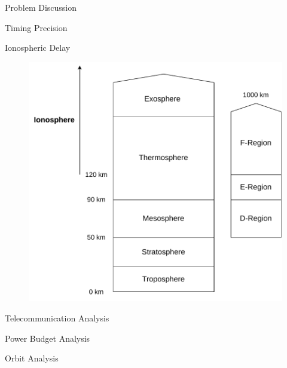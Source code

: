 %
%
%
%
%

%
%
%
%
%

\begin{frame}{Problem Discussion}


\end{frame}

\begin{frame}{Timing Precision}


\end{frame}

\begin{frame}{Ionospheric Delay}

    \begin{figure}[!ht]
        \begin{center}
            \includegraphics[width=0.6\columnwidth]{figures/atmosphere-model}
        \end{center}
    \end{figure}

\end{frame}

\begin{frame}{Telecommunication Analysis}


\end{frame}

\begin{frame}{Power Budget Analysis}


\end{frame}

\begin{frame}{Orbit Analysis}


\end{frame}
